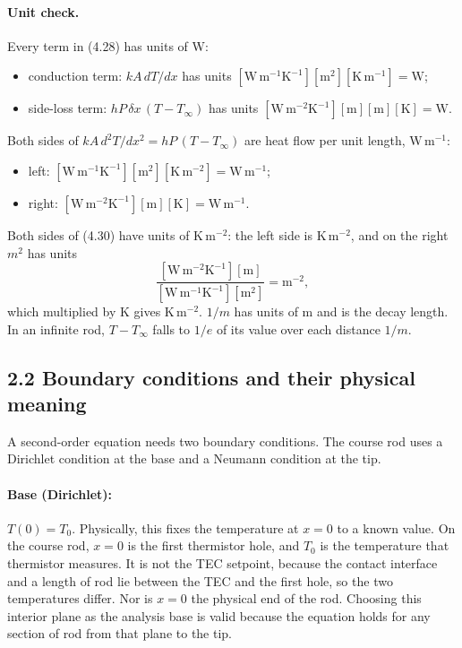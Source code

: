 \documentclass[reprint, amsmath, amssymb, aps, prl]{revtex4-2}
\newcommand{\WmK}{\mathrm{W\,m^{-1}K^{-1}}}
\newcommand{\WmmK}{\mathrm{W\,m^{-2}K^{-1}}}
\begin{document}
\paragraph*{Unit check.}
Every term in (4.28) has units of W:
\begin{itemize}
\item conduction term: $kA\,dT/dx$ has units
$[\WmK][\mathrm{m^2}][\mathrm{K\,m^{-1}}]=\mathrm{W}$;
\item side-loss term: $hP\,\delta x\,(T-T_\infty)$ has units
$[\WmmK][\mathrm{m}][\mathrm{m}][\mathrm{K}]=\mathrm{W}$.
\end{itemize}
Both sides of $kA\,d^2T/dx^2=hP\,(T-T_\infty)$ are heat flow per unit length,
$\mathrm{W\,m^{-1}}$:
\begin{itemize}
\item left: $[\WmK][\mathrm{m^2}][\mathrm{K\,m^{-2}}]=\mathrm{W\,m^{-1}}$;
\item right: $[\WmmK][\mathrm{m}][\mathrm{K}]=\mathrm{W\,m^{-1}}$.
\end{itemize}
Both sides of (4.30) have units of $\mathrm{K\,m^{-2}}$: the left side is
$\mathrm{K\,m^{-2}}$, and on the right $m^2$ has units
\begin{equation*}
\frac{[\WmmK][\mathrm{m}]}{[\WmK][\mathrm{m^2}]}=\mathrm{m^{-2}},
\end{equation*}
which multiplied by K gives $\mathrm{K\,m^{-2}}$. $1/m$ has units of m and is the decay
length. In an infinite rod, $T-T_\infty$ falls to $1/e$ of its value over each distance
$1/m$.

\subsection*{2.2 Boundary conditions and their physical meaning}

A second-order equation needs two boundary conditions. The course rod uses a Dirichlet
condition at the base and a Neumann condition at the tip.

\paragraph*{Base (Dirichlet):} $T(0)=T_0$. Physically, this fixes the temperature at
$x=0$ to a known value. On the course rod, $x=0$ is the first thermistor hole, and $T_0$
is the temperature that thermistor measures. It is not the TEC setpoint, because the
contact interface and a length of rod lie between the TEC and the first hole, so the two
temperatures differ. Nor is $x=0$ the physical end of the rod. Choosing this interior
plane as the analysis base is valid because the equation holds for any section of rod
from that plane to the tip.
\end{document}
